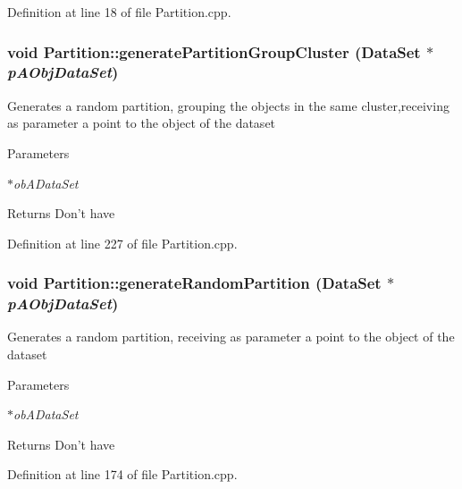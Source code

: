 Definition at line 18 of file Partition.cpp.\hypertarget{classPartition_a6e63e73de79cb57ef37261c15aedce47}{
\subsubsection[{generatePartitionGroupCluster}]{\setlength{\rightskip}{0pt plus 5cm}void Partition::generatePartitionGroupCluster ({\bf DataSet} $\ast$ {\em pAObjDataSet})}}
\label{classPartition_a6e63e73de79cb57ef37261c15aedce47}
Generates a random partition, grouping the objects in the same cluster,receiving as parameter a point to the object of the dataset 
\begin{DoxyParams}{Parameters}
\item[{\em $\ast$obADataSet}]\end{DoxyParams}
\begin{DoxyReturn}{Returns}
Don't have 
\end{DoxyReturn}


Definition at line 227 of file Partition.cpp.\hypertarget{classPartition_a2c1bdfc1d754486482e9b0225c4eb184}{
\subsubsection[{generateRandomPartition}]{\setlength{\rightskip}{0pt plus 5cm}void Partition::generateRandomPartition ({\bf DataSet} $\ast$ {\em pAObjDataSet})}}
\label{classPartition_a2c1bdfc1d754486482e9b0225c4eb184}
Generates a random partition, receiving as parameter a point to the object of the dataset 
\begin{DoxyParams}{Parameters}
\item[{\em $\ast$obADataSet}]\end{DoxyParams}
\begin{DoxyReturn}{Returns}
Don't have 
\end{DoxyReturn}


Definition at line 174 of file Partition.cpp.

